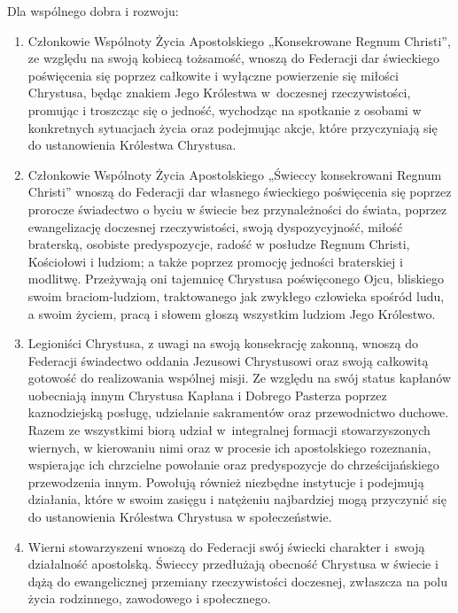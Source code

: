 

 Dla wspólnego dobra i rozwoju:


\begin{enumerate}


\item Członkowie Wspólnoty Życia Apostolskiego „Konsekrowane Regnum Christi”, ze względu na swoją kobiecą tożsamość, wnoszą do Federacji dar świeckiego poświęcenia się poprzez całkowite i wyłączne powierzenie się miłości Chrystusa, będąc znakiem Jego Królestwa \mbox{w doczesnej} rzeczywistości, promując i troszcząc się o jedność, wychodząc na spotkanie z osobami w konkretnych sytuacjach życia oraz podejmując akcje, które przyczyniają się do ustanowienia Królestwa Chrystusa.


\item Członkowie Wspólnoty Życia Apostolskiego „Świeccy konsekrowani Regnum Christi” wnoszą do Federacji dar własnego świeckiego poświęcenia się  poprzez prorocze świadectwo o byciu w świecie bez przynależności do świata, poprzez ewangelizację doczesnej rzeczywistości, swoją dyspozycyjność, miłość braterską, osobiste predyspozycje, radość w posłudze Regnum Christi, Kościołowi i ludziom; a także poprzez promocję jedności braterskiej i modlitwę. Przeżywają oni tajemnicę Chrystusa poświęconego Ojcu, bliskiego swoim braciom-ludziom, traktowanego jak zwykłego człowieka spośród ludu, a swoim życiem, pracą i słowem głoszą wszystkim ludziom Jego Królestwo.


\item Legioniści Chrystusa, z uwagi na swoją konsekrację zakonną, wnoszą do Federacji świadectwo oddania Jezusowi Chrystusowi oraz swoją całkowitą gotowość do realizowania wspólnej misji. Ze względu na swój status kapłanów uobecniają innym Chrystusa Kapłana i Dobrego Pasterza poprzez kaznodziejską posługę, udzielanie sakramentów oraz przewodnictwo duchowe. Razem ze wszystkimi biorą udział \mbox{w integralnej} formacji stowarzyszonych wiernych, w kierowaniu nimi oraz w procesie ich apostolskiego rozeznania, wspierając ich chrzcielne powołanie oraz predyspozycje do chrześcijańskiego przewodzenia innym. Powołują również niezbędne instytucje i podejmują działania, które w swoim zasięgu i natężeniu najbardziej mogą przyczynić się do ustanowienia Królestwa Chrystusa w społeczeństwie.


\item Wierni stowarzyszeni wnoszą do Federacji swój świecki charakter \mbox{i swoją} działalność apostolską. Świeccy przedłużają obecność Chrystusa w świecie i dążą do ewangelicznej przemiany rzeczywistości doczesnej, zwłaszcza na polu życia rodzinnego, zawodowego i społecznego.


\end{enumerate}


